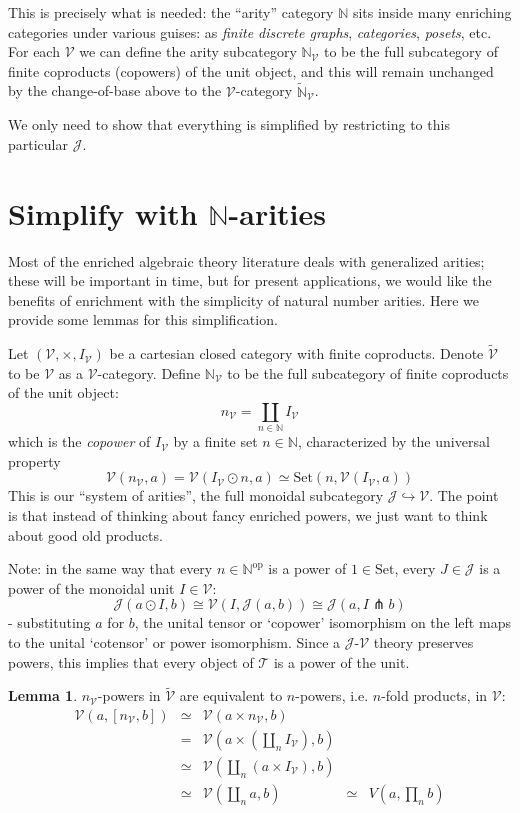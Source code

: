 \documentclass[a4paper,UKenglish]{article}
\theoremstyle{definition}
\newtheorem{lemma}[theorem]{Lemma}
\newcommand{\Set}{\mathrm{Set}}
\newcommand{\op}{\mathrm{op}}
\newcommand{\NN}{\mathbb{N}}
\newcommand{\V}{\mathscr{V}}
\newcommand{\T}{\mathscr{T}}
\newcommand{\J}{\mathscr{J}}
\newcommand{\pfk}{\pitchfork}
\begin{document}
This is precisely what is needed: the ``arity'' category $\NN$ sits inside many enriching categories under various guises: as \textit{finite discrete graphs}, \textit{categories}, \textit{posets}, etc. For each $\V$ we can define the arity subcategory $\NN_\V$ to be the full subcategory of finite coproducts (copowers) of the unit object, and this will remain unchanged by the change-of-base above to the $\V$-category $\tilde{\NN}_\V$.

We only need to show that everything is simplified by restricting to this particular $\J$.

\section{Simplify with $\NN$-arities}

Most of the enriched algebraic theory literature deals with generalized arities; these will be important in time, but for present applications, we would like the benefits of enrichment with the simplicity of natural number arities. Here we provide some lemmas for this simplification.

Let $(\V,\times,I_\V)$ be a cartesian closed category with finite coproducts. Denote $\tilde{\V}$ to be $\V$ as a $\V$-category. Define $\NN_\V$ to be the full subcategory of finite coproducts of the unit object: $$n_\V = \coprod_{n \in \NN} I_\V$$ which is the \textit{copower} of $I_\V$ by a finite set $n \in \NN$, characterized by the universal property $$\V(n_\V,a) = \V(I_\V \odot n,a) \simeq \Set(n,\V(I_\V,a))$$ This is our ``system of arities'', the full monoidal subcategory $\J \hookrightarrow \V$. The point is that instead of thinking about fancy enriched powers, we just want to think about good old products.

Note: in the same way that every $n\in \NN^\op$ is a power of $1 \in \Set$, every $J\in \J$ is a power of the monoidal unit $I\in \V$: $$\J(a\odot I,b) \cong \V(I, \J(a,b)) \cong \J(a,I\pfk b)$$ - substituting $a$ for $b$, the unital tensor or `copower' isomorphism on the left maps to the unital `cotensor' or power isomorphism. Since a $\J$-$\V$ theory preserves powers, this implies that every object of $\T$ is a power of the unit.

\begin{lemma} $n_\V$-powers in $\tilde{\V}$ are equivalent to $n$-powers, i.e. $n$-fold products, in $\V$:
	\[\begin{array}{rclcl}
	\V(a,[n_\V,b]) & \simeq & \V(a\times n_\V,b) & &\\
	& = & \V(a\times (\coprod_n I_\V),b) & &\\
	& \simeq & \V(\coprod_n(a\times I_\V),b) & &\\
	& \simeq & \V(\coprod_n a,b) & \simeq & V(a,\prod_n b)\\
	\end{array}\]
\end{lemma}
\end{document}
